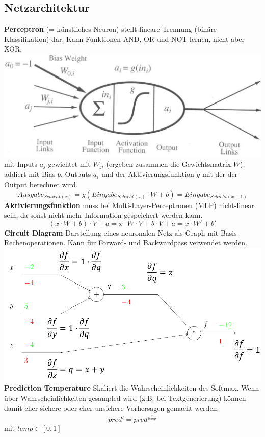 \documentclass[12pt]{article}
\begin{document}
	\subsection{Netzarchitektur}
	\textbf{Perceptron} (= künstliches Neuron) stellt lineare Trennung (binäre Klassifikation) dar. Kann Funktionen AND, OR und NOT lernen, nicht aber XOR.\\
	\includegraphics[width=\linewidth]{figures/perceptron.png}\\
	mit Inputs $a_j$ gewichtet mit $W_{ji}$ (ergeben zusammen die Gewichtsmatrix $W$), addiert mit Bias $b$, Outputs $a_i$ und der Aktivierungsfunktion $g$ mit der der Output berechnet wird.
	$$Ausgabe_{Schicht(x)} = g(Eingabe_{Schicht(x)} \cdot W + b) = Eingabe_{Schicht(x+1)}$$
	\textbf{Aktivierungsfunktion} muss bei Multi-Layer-Perceptronen (MLP) nicht-linear sein, da sonst nicht mehr Information gespeichert werden kann.
	$$(x \cdot W + b) \cdot V + a = x \cdot W \cdot V + b \cdot V + a = x \cdot W' + b'$$
	\textbf{Circuit Diagram} Darstellung eines neuronalen Netz als Graph mit Basis-Rechenoperationen. Kann für Forward- und Backwardpass verwendet werden.\\
	\includegraphics[width=\linewidth]{figures/circuit-diagram.png}\\
	\textbf{Prediction Temperature} Skaliert die Wahrscheinlichkeiten des Softmax. Wenn über Wahrscheinlichkeiten gesampled wird (z.B. bei Textgenerierung) können damit eher sichere oder eher unsichere Vorhersagen gemacht werden.
	$$pred' = pred^{\frac{1}{temp}}$$
	mit $temp \in [0,1]$
\end{document}
